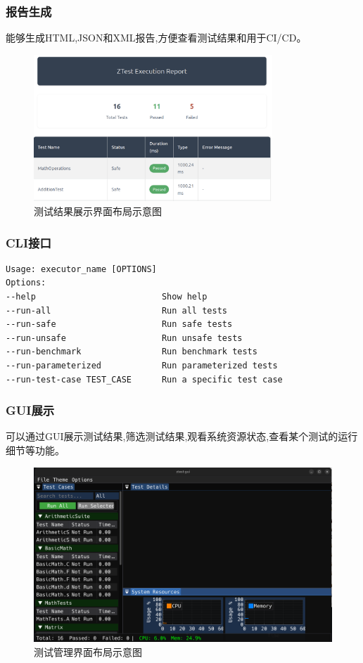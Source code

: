 \documentclass{article}
\begin{document}
\subsubsection{报告生成}
能够生成HTML,JSON和XML报告,方便查看测试结果和用于CI/CD。
\begin{figure}[H]
    \centering
    \includegraphics[width=0.8\textwidth]{img/report.png}
    \caption{测试结果展示界面布局示意图}
    \label{fig:report}
    \small
\end{figure}
\subsubsection{CLI接口}
\begin{lstlisting}
Usage: executor_name [OPTIONS] 
Options: 
--help                         Show help 
--run-all                      Run all tests
--run-safe                     Run safe tests
--run-unsafe                   Run unsafe tests
--run-benchmark                Run benchmark tests
--run-parameterized            Run parameterized tests
--run-test-case TEST_CASE      Run a specific test case
\end{lstlisting}

\subsubsection{GUI展示}
可以通过GUI展示测试结果,筛选测试结果,观看系统资源状态,查看某个测试的运行细节等功能。
\begin{figure}[H]
    \centering
    \includegraphics[width=\textwidth]{img/gui.png}
    \caption{测试管理界面布局示意图}
    \label{fig:gui}
    \small
\end{figure}
\end{document}
